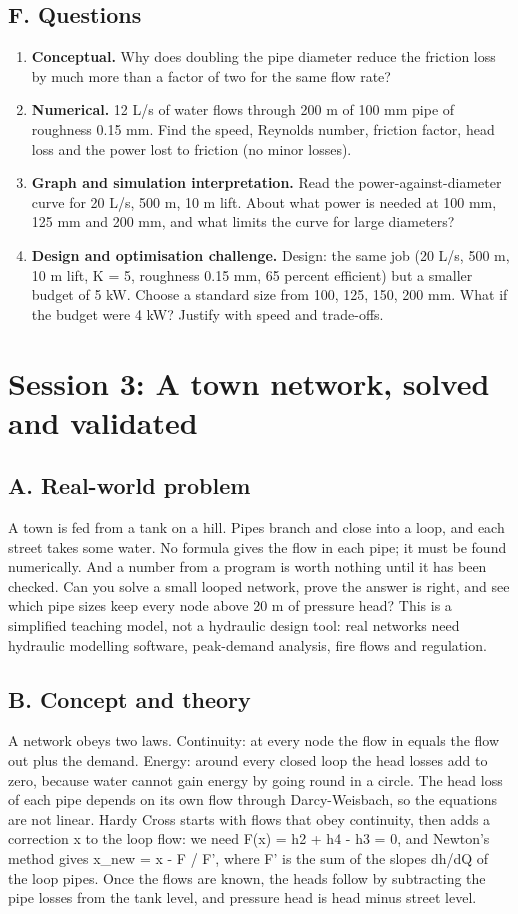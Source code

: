 \documentclass[11pt,a4paper]{article}
\begin{document}
\subsection*{F. Questions}
\begin{enumerate}[nosep]
\item \textbf{Conceptual.} Why does doubling the pipe diameter reduce the friction loss by much more than a factor of two for the same flow rate?
\item \textbf{Numerical.} 12 L/s of water flows through 200 m of 100 mm pipe of roughness 0.15 mm. Find the speed, Reynolds number, friction factor, head loss and the power lost to friction (no minor losses).
\item \textbf{Graph and simulation interpretation.} Read the power-against-diameter curve for 20 L/s, 500 m, 10 m lift. About what power is needed at 100 mm, 125 mm and 200 mm, and what limits the curve for large diameters?
\item \textbf{Design and optimisation challenge.} Design: the same job (20 L/s, 500 m, 10 m lift, K = 5, roughness 0.15 mm, 65 percent efficient) but a smaller budget of 5 kW. Choose a standard size from 100, 125, 150, 200 mm. What if the budget were 4 kW? Justify with speed and trade-offs.
\end{enumerate}

\section{Session 3: A town network, solved and validated}

\subsection*{A. Real-world problem}
A town is fed from a tank on a hill. Pipes branch and close into a loop, and each street takes some water. No formula gives the flow in each pipe; it must be found numerically. And a number from a program is worth nothing until it has been checked. Can you solve a small looped network, prove the answer is right, and see which pipe sizes keep every node above 20 m of pressure head? This is a simplified teaching model, not a hydraulic design tool: real networks need hydraulic modelling software, peak-demand analysis, fire flows and regulation.

\subsection*{B. Concept and theory}
A network obeys two laws. Continuity: at every node the flow in equals the flow out plus the demand. Energy: around every closed loop the head losses add to zero, because water cannot gain energy by going round in a circle. The head loss of each pipe depends on its own flow through Darcy-Weisbach, so the equations are not linear. Hardy Cross starts with flows that obey continuity, then adds a correction x to the loop flow: we need F(x) = h2 + h4 - h3 = 0, and Newton's method gives x\_new = x - F / F', where F' is the sum of the slopes dh/dQ of the loop pipes. Once the flows are known, the heads follow by subtracting the pipe losses from the tank level, and pressure head is head minus street level.
\end{document}
